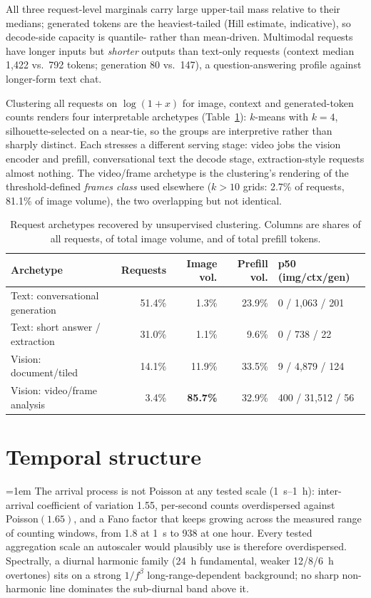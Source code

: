 All three request-level marginals carry large upper-tail mass relative to their
medians; generated tokens are the heaviest-tailed (Hill estimate, indicative),
so decode-side capacity is quantile- rather than mean-driven. Multimodal
requests have longer inputs but \emph{shorter} outputs than text-only requests
(context median 1{,}422 vs.\ 792 tokens; generation 80 vs.\ 147), a
question-answering profile against longer-form text chat.

Clustering all requests on $\log(1{+}x)$ for image, context and
generated-token counts renders four interpretable archetypes
(Table~\ref{tab:eda-archetypes}): $k$-means with $k{=}4$, silhouette-selected on
a near-tie, so the groups are interpretive rather than sharply distinct. Each
stresses a different serving stage: video jobs the vision encoder and prefill,
conversational text the decode stage, extraction-style requests almost nothing.
The video/frame archetype is the clustering's rendering of the
threshold-defined \emph{frames class} used elsewhere ($k{>}10$ grids: 2.7\% of
requests, 81.1\% of image volume), the two overlapping but not identical.

\begin{table}[htbp]
\centering
\caption[Request archetypes]{Request archetypes recovered by unsupervised
clustering. Columns are shares of all requests, of total image volume, and of
total prefill tokens.}
\label{tab:eda-archetypes}
\footnotesize
\setlength{\tabcolsep}{4pt}
\begin{tabular}{lrrrl}
\toprule
Archetype & Requests & Image vol. & Prefill vol. & p50 (img/ctx/gen) \\
\midrule
Text: conversational generation & 51.4\% & 1.3\% & 23.9\% & 0 / 1{,}063 / 201 \\
Text: short answer / extraction & 31.0\% & 1.1\% & 9.6\% & 0 / 738 / 22 \\
Vision: document/tiled          & 14.1\% & 11.9\% & 33.5\% & 9 / 4{,}879 / 124 \\
Vision: video/frame analysis    & 3.4\%  & \textbf{85.7\%} & 32.9\% & 400 / 31{,}512 / 56 \\
\bottomrule
\end{tabular}
\end{table}

\section{Temporal structure}
\label{sec:eda-temporal}

{\emergencystretch=1em
The arrival process is not Poisson at any tested scale
(\SI{1}{\second}--\SI{1}{\hour}): inter-arrival coefficient of variation 1.55,
per-second counts overdispersed against Poisson$(1.65)$, and a Fano factor that
keeps growing across the measured range of counting windows, from 1.8 at
\SI{1}{\second} to 938 at one hour. Every tested aggregation scale an
autoscaler would plausibly use is therefore overdispersed. Spectrally, a diurnal harmonic family
(\SI{24}{\hour} fundamental, weaker 12/8/\SI{6}{\hour} overtones) sits on a
strong $1/f^{\beta}$ long-range-dependent background; no sharp non-harmonic
line dominates the sub-diurnal band above it.\par}

